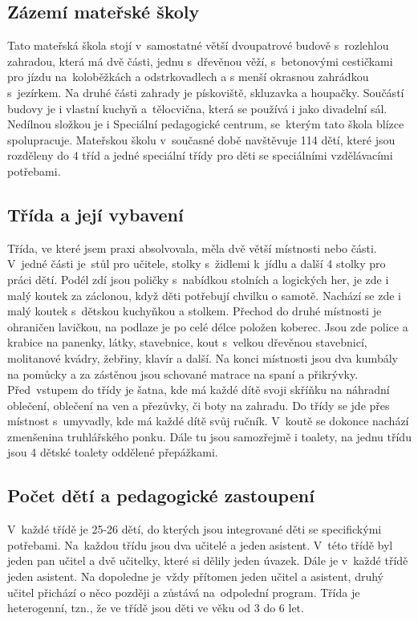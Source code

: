 		\subsection{Zázemí mateřské školy}

			Tato mateřská škola stojí v samostatné větší dvoupatrové budově s rozlehlou zahradou, která má dvě části, jednu s dřevěnou věží, s betonovými cestičkami pro jízdu na koloběžkách a odstrkovadlech a s menší okrasnou zahrádkou s jezírkem. Na druhé části zahrady je pískoviště, skluzavka a houpačky. Součástí budovy je i vlastní kuchyň a tělocvična, která se používá i jako divadelní sál. Nedílnou složkou je i Speciální pedagogické centrum, se kterým tato škola blízce spolupracuje. Mateřskou školu v současné době navštěvuje 114 dětí, které jsou rozděleny do 4 tříd a jedné speciální třídy pro děti se speciálními vzdělávacími potřebami. 

		\subsection{Třída a její vybavení}
			Třída, ve které jsem praxi absolvovala, měla dvě větší místnosti nebo části. V jedné části je stůl pro učitele, stolky s židlemi k jídlu a další 4 stolky pro práci dětí. Podél zdí jsou poličky s nabídkou stolních a logických her, je zde i malý koutek za záclonou, když děti potřebují chvilku o samotě. Nachází se zde i malý koutek s dětskou kuchyňkou a stolkem. Přechod do druhé místnosti je ohraničen lavičkou, na podlaze je po celé délce položen koberec. Jsou zde police a krabice na panenky, látky, stavebnice, kout s velkou dřevěnou stavebnicí, molitanové kvádry, žebřiny, klavír a další. Na konci místnosti jsou dva kumbály na pomůcky a za zástěnou jsou schované matrace na spaní a přikrývky. Před vstupem do třídy je šatna, kde má každé dítě svoji skříňku na náhradní oblečení, oblečení na ven a přezůvky, či boty na zahradu. Do třídy se jde přes místnost s umyvadly, kde má každé dítě svůj ručník. V koutě se dokonce nachází zmenšenina truhlářského ponku. Dále tu jsou samozřejmě i toalety, na jednu třídu jsou 4 dětské toalety oddělené přepážkami. 

		\subsection{Počet dětí a pedagogické zastoupení}
			V každé třídě je 25-26 dětí, do kterých jsou integrované děti se specifickými potřebami. Na každou třídu jsou dva učitelé a jeden asistent. V této třídě byl jeden pan učitel a dvě učitelky, které si dělily jeden úvazek. Dále je v každé třídě jeden asistent. Na dopoledne je vždy přítomen jeden učitel a asistent, druhý učitel přichází o něco později a zůstává na odpolední program. Třída je heterogenní, tzn., že ve třídě jsou děti ve věku od 3 do 6 let. 

